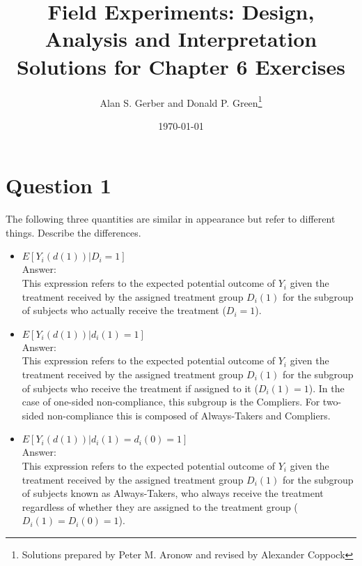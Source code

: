 \documentclass[11pt,notitlepage]{article}\usepackage[]{graphicx}\usepackage[]{color}
\title{Field Experiments: Design, Analysis and Interpretation \\
Solutions for Chapter 6 Exercises}
\author{Alan S. Gerber and Donald P. Green\footnote{Solutions prepared by Peter M. Aronow and revised by Alexander Coppock}}
\date{\today}
\begin{document}
\maketitle


\section*{Question 1}
The following three quantities are similar in appearance but refer to different things. Describe the differences.
\begin{itemize}
\item $E[Y_i(d(1))|D_i = 1]$ \\
Answer:\\
This expression refers to the expected potential outcome of $Y_i$ given the treatment received by the assigned treatment group $D_i(1)$ for the subgroup of subjects who actually receive the treatment ($D_i=1$).
\item $E[Y_i(d(1))|d_i(1) = 1]$ \\
Answer:\\
This expression refers to the expected potential outcome of $Y_i$ given the treatment received by the assigned treatment group $D_i(1)$ for the subgroup of subjects who receive the treatment if assigned to it ($D_i(1)=1$). In the case of one-sided non-compliance, this subgroup is the Compliers. For two-sided non-compliance this is composed of Always-Takers and Compliers.
\item $E[Y_i(d(1))|d_i(1) = d_i(0) = 1]$\\
Answer:\\
This expression refers to the expected potential outcome of $Y_i$ given the treatment received by the assigned treatment group $D_i (1)$ for the subgroup of subjects known as Always-Takers, who always receive the treatment regardless of whether they are assigned to the treatment group ($D_i (1)=D_i (0)=1$). 

\end{itemize}
\end{document}
